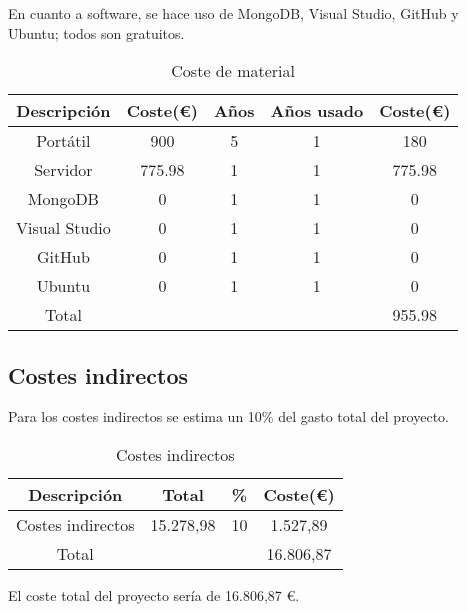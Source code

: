 En cuanto a software, se hace uso de MongoDB, Visual Studio, GitHub y Ubuntu; todos son gratuitos.

\begin{table}[h!]
\centering
\begin{tabular}{|c|c|c|c|c|}
\hline
\textbf{Descripción} & \textbf{Coste(€)} & \textbf{Años} & \textbf{Años usado} & \textbf{Coste(€)} \\
\hline
Portátil & 900 & 5 & 1 & 180 \\
\hline
Servidor & 775.98 & 1 & 1 & 775.98 \\
\hline
MongoDB & 0 & 1 & 1 & 0 \\
\hline
Visual Studio & 0 & 1 & 1 & 0 \\
\hline
GitHub & 0 & 1 & 1 & 0 \\
\hline
Ubuntu & 0 & 1 & 1 & 0 \\
\hline
Total &  & & & 955.98 \\
\hline
\end{tabular}
\caption{Coste de material}
\label{tab:ejemplo}
\end{table}

\subsection*{Costes indirectos}
Para los costes indirectos se estima un 10\% del gasto total del proyecto.
\begin{table}[h!]
\centering
\begin{tabular}{|c|c|c|c|}
\hline
\textbf{Descripción} & \textbf{Total} & \textbf{\%} & \textbf{Coste(€)} \\
\hline
Costes indirectos & 15.278,98 & 10 & 1.527,89 \\
\hline
Total &  &  & 16.806,87 \\
\hline
\end{tabular}
\caption{Costes indirectos}
\label{tab:ejemplo}
\end{table}

El coste total del proyecto sería de 16.806,87 €.